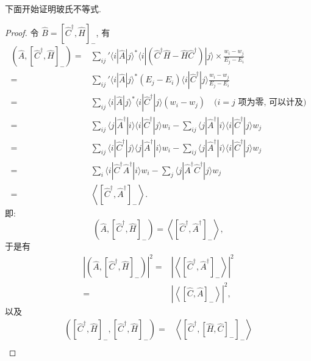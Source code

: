 下面开始证明玻氏不等式.
\begin{proof}
    令 $\hat{B}=\left[ \hat{C}^\dagger ,\hat{H} \right]_-$, 有
    \begin{align}
        \left( \hat{A},\left[ \hat{C}^\dagger,\hat{H} \right]_- \right)=&\sum_{ij}^{ }{}'\langle i|\hat{A}|j \rangle^*\langle i|(\hat{C}^\dagger \hat{H}-\hat{H}\hat{C}^\dagger)|j \rangle\times\frac{w_i-w_j}{E_j-E_i}\nonumber\\
        =&\sum_{ij}^{ }{}'\langle i|\hat{A}|j \rangle^*(E_j-E_i)\langle i|\hat{C}^\dagger|j \rangle\frac{w_i-w_j}{E_j-E_i}\nonumber\\
        =&\sum_{ij}\langle i|\hat{A}|j \rangle^*\langle i|\hat{C}^\dagger |j \rangle(w_i-w_j)\quad\text{($i=j$ 项为零, 可以计及)}\nonumber\\
        =&\sum_{ij}\langle j|\hat{A}^\dagger|i \rangle\langle i|\hat{C}^\dagger|j \rangle w_i-\sum_{ij}\langle j|\hat{A}^\dagger|i \rangle\langle i|\hat{C}^\dagger|j \rangle w_j\nonumber\\
        =&\sum_{ij}\langle i|\hat{C}^\dagger |j \rangle\langle j|\hat{A}^\dagger|i \rangle w_i-\sum_{ij}\langle j|\hat{A}^\dagger|i \rangle\langle i|\hat{C}^\dagger|j \rangle w_j\nonumber\\
        =&\sum_i\langle i|\hat{C}^\dagger \hat{A}^\dagger|i \rangle w_i-\sum_j\langle j|\hat{A}^\dagger \hat{C}^\dagger|j \rangle w_j\nonumber\nonumber\\
        =&\left\langle \left[ \hat{C}^\dagger,\hat{A}^\dagger \right]_- \right\rangle.
    \end{align}
    即:
    \begin{equation}
        \left( \hat{A},\left[ \hat{C}^\dagger,\hat{H} \right]_- \right)=\left\langle \left[ \hat{C}^\dagger,\hat{A}^\dagger \right]_- \right\rangle,\label{uneq-6}
    \end{equation}
    于是有 
     \begin{align}\label{uneq-7}
            \left| \left( \hat{A},\left[ \hat{C}^\dagger,\hat{H} \right]_- \right) \right|^2=&\left| \left\langle \left[ \hat{C}^\dagger ,\hat{A}^\dagger \right]_- \right\rangle \right|^2\nonumber\\
            =&\left| \left\langle \left[ \hat{C},\hat{A} \right]_- \right\rangle \right|^2,
        \end{align}
    以及
      \begin{align}\label{uneq-8}
            \left(\left[ \hat{C}^\dagger,\hat{H} \right]_-,\left[ \hat{C}^\dagger,\hat{H} \right]_-\right)=&\left\langle \left[ \hat{C}^\dagger,\left[ \hat{H},\hat{C} \right]_- \right]_- \right\rangle\nonumber\\

\end{align}
\end{proof}
